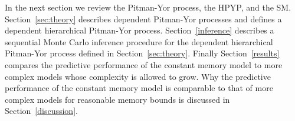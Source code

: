 In the next section we review the Pitman-Yor process, the HPYP, and the 
SM.   Section~\ref{sec:theory} describes dependent Pitman-Yor processes and defines a dependent hierarchical Pitman-Yor process.   Section~\ref{inference} describes a sequential Monte Carlo inference procedure for the dependent hierarchical Pitman-Yor process defined in Section~\ref{sec:theory}.  Finally  Section~\ref{results} compares the predictive performance of the constant memory model to more complex models whose complexity is allowed to grow.  Why the predictive performance of the constant memory model is comparable to that of more complex models for reasonable memory bounds is discussed in Section~\ref{discussion}.





